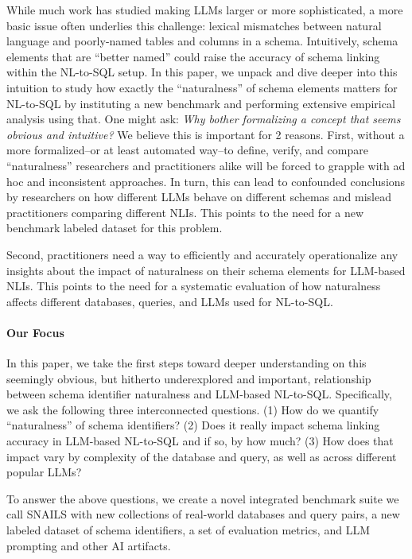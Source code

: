 While much work has studied making LLMs larger or more sophisticated, a more basic issue often underlies this challenge: lexical mismatches between natural language and poorly-named tables and columns in a schema.
Intuitively, schema elements that are ``better named'' could raise the accuracy of schema linking within the NL-to-SQL setup.
In this paper, we unpack and dive deeper into this intuition to study how exactly the ``naturalness'' of schema elements matters for NL-to-SQL by instituting a new benchmark and performing extensive empirical analysis using that.
One might ask: \emph{Why bother formalizing a concept that seems obvious and intuitive?} 
We believe this is important for 2 reasons.
First, without a more formalized--or at least automated way--to define, verify, and compare ``naturalness'' researchers and practitioners alike will be forced to grapple with ad hoc and inconsistent approaches. 
In turn, this can lead to confounded conclusions by researchers on how different LLMs behave on different schemas and mislead practitioners comparing different NLIs. 
This points to the need for a new benchmark labeled dataset for this problem.

Second, practitioners need a way to efficiently and accurately operationalize any insights about the impact of naturalness on their schema elements for LLM-based NLIs.
This points to the need for a systematic evaluation of how naturalness affects different databases, queries, and LLMs used for NL-to-SQL.

\paragraph{\textbf{Our Focus}}

In this paper, we take the first steps toward deeper understanding on this seemingly obvious, but hitherto underexplored and important, relationship between schema identifier naturalness and LLM-based NL-to-SQL.
Specifically, we ask the following three interconnected questions.
(1) How do we quantify ``naturalness'' of schema identifiers? (2) Does it really impact schema linking accuracy in LLM-based NL-to-SQL and if so, by how much? (3) How does that impact vary by complexity of the database and query, as well as across different popular LLMs?

To answer the above questions, we create a novel integrated benchmark suite we call SNAILS with new collections of real-world databases and query pairs, a new labeled dataset of schema identifiers, a set of evaluation metrics, and LLM prompting and other AI artifacts.


